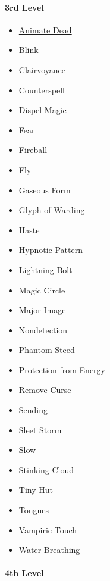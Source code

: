 \paragraph{3rd Level}\label{_3rd_level_2}

\begin{itemize}
\item
  \hyperref[spell-animate-dead]{Animate Dead}
\item
  Blink
\item
  Clairvoyance
\item
  Counterspell
\item
  Dispel Magic
\item
  Fear
\item
  Fireball
\item
  Fly
\item
  Gaseous Form
\item
  Glyph of Warding
\item
  Haste
\item
  Hypnotic Pattern
\item
  Lightning Bolt
\item
  Magic Circle
\item
  Major Image
\item
  Nondetection
\item
  Phantom Steed
\item
  Protection from Energy
\item
  Remove Curse
\item
  Sending
\item
  Sleet Storm
\item
  Slow
\item
  Stinking Cloud
\item
  Tiny Hut
\item
  Tongues
\item
  Vampiric Touch
\item
  Water Breathing
\end{itemize}

\paragraph{4th Level}\label{_4th_level_2}


